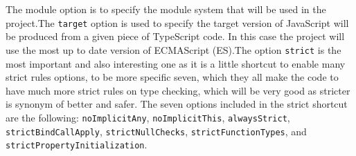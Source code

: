 The module option is to specify the module system that will be used in the
project.The \texttt{target} option is used to specify the target version of
JavaScript will be produced from a given piece of TypeScript code. In this case
the project will use the most up to date version of ECMAScript (ES).The option
\texttt{strict} is the most important and also interesting one as it is a little
shortcut to enable many strict rules options, to be more specific seven, which
they all make the code to have much more strict rules on type checking, which
will be very good as stricter is synonym of better and safer. The seven options
included in the strict shortcut are the following: \texttt{noImplicitAny},
\texttt{noImplicitThis}, \texttt{alwaysStrict}, \texttt{strictBindCallApply},
\texttt{strictNullChecks}, \texttt{strictFunctionTypes}, and
\texttt{strictPropertyInitialization}.
